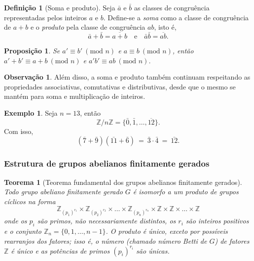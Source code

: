 \documentclass[a4paper,12pt]{report}
\theoremstyle{plain}
\newtheorem{teorema}{Teorema}[section]
\newtheorem{proposicao}{Proposição}[section]
\theoremstyle{definition}
\newtheorem{definicao}{Definição}[section]
\newtheorem{observacao}{Observação}[section]
\newtheorem{exemplo}{Exemplo}[section]
\begin{document}
	\begin{definicao}[Soma e produto]
		Seja \(\bar a\) e \(\bar b\) as classes de congruência representadas pelos inteiros \(a\) e \(b\). Define-se a \emph{soma} como a classe de congruência de \(a+b\) e o \emph{produto} pela classe de congruência \(ab\), isto é, \[\bar a + \bar b = \overline{a+b} \quad \text{e}\quad \bar a\bar b = \overline{ab}.\]	
	\end{definicao}
	
	\begin{proposicao}
		Se \(a' \equiv b'\ (\text{mod }n)\) e \(a\equiv b\ (\text{mod }n)\), então
		\(a' + b' \equiv a+b\ (\text{mod }n)\) e
		\(a'b' \equiv ab \ (\text{mod }n)\).
	\end{proposicao}
	
	\begin{observacao}
		Além disso, a soma e produto também continuam respeitando as
		propriedades associativas, comutativas e distributivas, desde que o
		mesmo se mantém para soma e multiplicação de inteiros.
	\end{observacao}
	
	\begin{exemplo}
		Seja \(n = 13\), então
		\[\mathbb{Z}/n\mathbb{Z} =  \{\bar{0}, \bar{1},\dots,\overline{12}\}.\]
		Com isso,
		\[(\bar 7 + \bar 9)(\bar{11} + \bar 6) \ = \ \bar 3 \cdot \bar 4 \ = \ \bar{12}.\]
	\end{exemplo}
	
	
	\subsubsection{Estrutura de grupos abelianos finitamente gerados}
	
	\begin{teorema}[Teorema fundamental dos grupos abelianos finitamente gerados] \label{teo:abelianfinitelygenerately}
		Todo grupo abeliano finitamente gerado $G$ é isomorfo a um produto de grupos cíclicos na forma $$\mathbb{Z}_{(p_1)^{r_1}}\times\mathbb{Z}_{(p_2)^{r_2}}\times\dots\times\mathbb{Z}_{(p_n)^{r_n}}\times\mathbb{Z}\times\mathbb{Z}\times\dots\times\mathbb{Z} $$ onde os $p_i$ são primos, não necessariamente distintos, os $r_i$ são inteiros positivos e o conjunto $\mathbb{Z}_n = \{0,1,\dots,n-1\}$. O produto é único, exceto por possíveis rearranjos dos fatores; isso é, o número (chamado \emph{número Betti de $G$}) de fatores $\mathbb{Z}$ é único e as potências de primos $(p_i)^{r_i}$ são únicas.
	\end{teorema}
	
\end{document}
